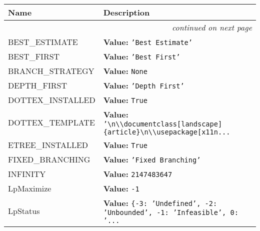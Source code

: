     \vspace{-1cm}
\hspace{\varindent}\begin{longtable}{|p{\varnamewidth}|p{\vardescrwidth}|l}
\cline{1-2}
\cline{1-2} \centering \textbf{Name} & \centering \textbf{Description}& \\
\cline{1-2}
\endhead\cline{1-2}\multicolumn{3}{r}{\small\textit{continued on next page}}\\\endfoot\cline{1-2}
\endlastfoot\raggedright B\-E\-S\-T\-\_\-E\-S\-T\-I\-M\-A\-T\-E\- & \raggedright \textbf{Value:} 
{\tt \texttt{'}\texttt{Best Estimate}\texttt{'}}&\\
\cline{1-2}
\raggedright B\-E\-S\-T\-\_\-F\-I\-R\-S\-T\- & \raggedright \textbf{Value:} 
{\tt \texttt{'}\texttt{Best First}\texttt{'}}&\\
\cline{1-2}
\raggedright B\-R\-A\-N\-C\-H\-\_\-S\-T\-R\-A\-T\-E\-G\-Y\- & \raggedright \textbf{Value:} 
{\tt None}&\\
\cline{1-2}
\raggedright D\-E\-P\-T\-H\-\_\-F\-I\-R\-S\-T\- & \raggedright \textbf{Value:} 
{\tt \texttt{'}\texttt{Depth First}\texttt{'}}&\\
\cline{1-2}
\raggedright D\-O\-T\-2\-T\-E\-X\-\_\-I\-N\-S\-T\-A\-L\-L\-E\-D\- & \raggedright \textbf{Value:} 
{\tt True}&\\
\cline{1-2}
\raggedright D\-O\-T\-2\-T\-E\-X\-\_\-T\-E\-M\-P\-L\-A\-T\-E\- & \raggedright \textbf{Value:} 
{\tt \texttt{'}\texttt{{\textbackslash}n{\textbackslash}{\textbackslash}documentclass[landscape]\{article\}{\textbackslash}n{\textbackslash}{\textbackslash}usepackage[x11n}\texttt{...}}&\\
\cline{1-2}
\raggedright E\-T\-R\-E\-E\-\_\-I\-N\-S\-T\-A\-L\-L\-E\-D\- & \raggedright \textbf{Value:} 
{\tt True}&\\
\cline{1-2}
\raggedright F\-I\-X\-E\-D\-\_\-B\-R\-A\-N\-C\-H\-I\-N\-G\- & \raggedright \textbf{Value:} 
{\tt \texttt{'}\texttt{Fixed Branching}\texttt{'}}&\\
\cline{1-2}
\raggedright I\-N\-F\-I\-N\-I\-T\-Y\- & \raggedright \textbf{Value:} 
{\tt 2147483647}&\\
\cline{1-2}
\raggedright L\-p\-M\-a\-x\-i\-m\-i\-z\-e\- & \raggedright \textbf{Value:} 
{\tt -1}&\\
\cline{1-2}
\raggedright L\-p\-S\-t\-a\-t\-u\-s\- & \raggedright \textbf{Value:} 
{\tt \texttt{\{}-3\texttt{: }\texttt{'}\texttt{Undefined}\texttt{'}\texttt{, }-2\texttt{: }\texttt{'}\texttt{Unbounded}\texttt{'}\texttt{, }-1\texttt{: }\texttt{'}\texttt{Infeasible}\texttt{'}\texttt{, }0\texttt{: }\texttt{'}\texttt{...}}&\\

\end{longtable}
